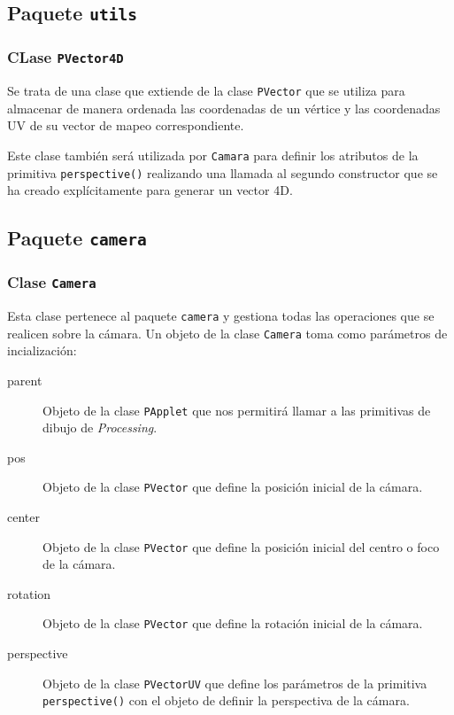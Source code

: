 \documentclass[10pt,a4paper]{report}
\begin{document}
	
	
	
	\subsection{Paquete \texttt{utils}}
	
	\subsubsection{CLase \texttt{PVector4D}}\label{class:PVectorUV}
	Se trata de una clase que extiende de la clase \texttt{PVector} que se utiliza para almacenar de manera ordenada las coordenadas de un vértice y las coordenadas UV de su vector de mapeo correspondiente. 
	
	Este clase también será utilizada por \texttt{Camara} para definir los atributos de la primitiva \texttt{perspective()} realizando una llamada al segundo constructor que se ha creado explícitamente para generar un vector 4D.
	
	
	
	\subsection{Paquete \texttt{camera}}
	\subsubsection{Clase \texttt{Camera}}\label{class:camera}
	Esta clase pertenece al paquete \texttt{camera} y gestiona todas las operaciones que se realicen sobre la cámara. Un objeto de la clase \texttt{Camera} toma como parámetros de incialización:
	\begin{description}
		\item[parent] Objeto de la clase \texttt{PApplet} que nos permitirá llamar a las primitivas de dibujo de \textit{Processing}.
		\item[pos] Objeto de la clase \texttt{PVector} que define la posición inicial de la cámara.
		\item[center] Objeto de la clase \texttt{PVector} que define la posición inicial del centro o foco de la cámara.
		\item[rotation] Objeto de la clase \texttt{PVector} que define la rotación inicial de la cámara.
		\item[perspective] Objeto de la clase \texttt{PVectorUV} que define los parámetros de la primitiva \texttt{perspective()} con el objeto de definir la perspectiva de la cámara.
	\end{description}
\end{document}
